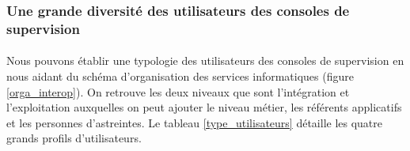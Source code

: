 		\subsubsection{Une grande diversité des utilisateurs des consoles de
		supervision}
			\paragraph{}%
			Nous pouvons établir une typologie des utilisateurs des consoles de
			supervision en nous aidant du schéma d’organisation
			des services informatiques (figure \ref{orga_interop}). On retrouve les
			deux niveaux que sont l’intégration et l’exploitation auxquelles on peut
			ajouter le niveau métier, les référents applicatifs et les personnes
			d'astreintes.
			Le tableau \ref{type_utilisateurs} détaille les quatre grands profils
			d’utilisateurs.
